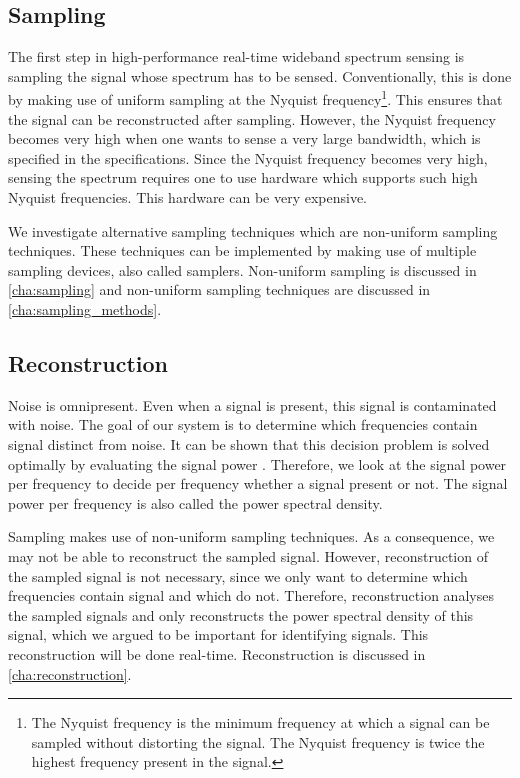 \documentclass[a4paper, openany, oneside]{memoir}
\begin{document}
\subsection{Sampling}
The first step in high-performance real-time wideband spectrum sensing is sampling the signal whose spectrum has to be sensed. Conventionally, this is done by making use of uniform sampling at the Nyquist frequency\footnote{The Nyquist frequency is the minimum frequency at which a signal can be sampled without distorting the signal. The Nyquist frequency is twice the highest frequency present in the signal.}. This ensures that the signal can be reconstructed after sampling. However, the Nyquist frequency becomes very high when one wants to sense a very large bandwidth, which is specified in the specifications. Since the Nyquist frequency becomes very high, sensing the spectrum requires one to use hardware which supports such high Nyquist frequencies. This hardware can be very expensive.

We investigate alternative sampling techniques which are non-uniform sampling techniques. These techniques can be implemented by making use of multiple sampling devices, also called samplers. Non-uniform sampling is discussed in \cref{cha:sampling} and non-uniform sampling techniques are discussed in \cref{cha:sampling_methods}.

\subsection{Reconstruction}
Noise is omnipresent. Even when a signal is present, this signal is contaminated with noise. The goal of our system is to determine which frequencies contain signal distinct from noise. It can be shown that this decision problem is solved optimally by evaluating the signal power \cite{axell2012spectrum}. Therefore, we look at the signal power per frequency to decide per frequency whether a signal present or not. The signal power per frequency is also called the power spectral density.

Sampling makes use of non-uniform sampling techniques. As a consequence, we may not be able to reconstruct the sampled signal. However, reconstruction of the sampled signal is not necessary, since we only want to determine which frequencies contain signal and which do not. Therefore, reconstruction analyses the sampled signals and only reconstructs the power spectral density of this signal, which we argued to be important for identifying signals. This reconstruction will be done real-time. Reconstruction is discussed in \cref{cha:reconstruction}.
\end{document}
